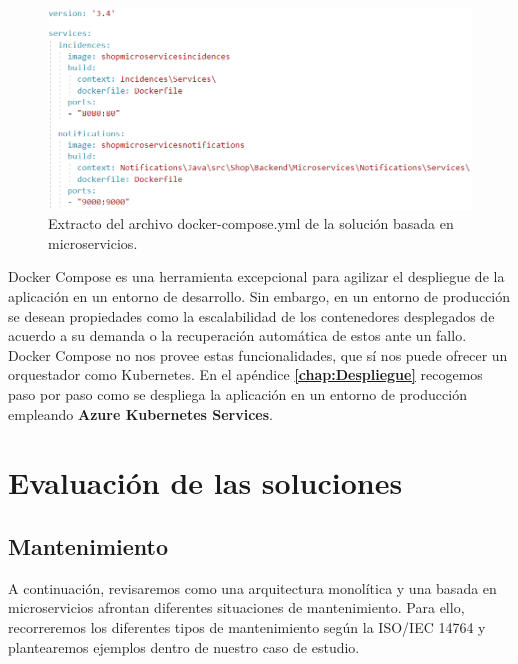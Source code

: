 \documentclass[11pt,spanish,listoffigures]{tfgetsinf}
\begin{document}
\begin{figure}[h]
\centering
\includegraphics[scale=0.7]{Compose}
\caption{Extracto del archivo docker-compose.yml de la solución basada en microservicios.}
\label{fig:Compose}
\end{figure}

Docker Compose es una herramienta excepcional para agilizar el despliegue de la aplicación en un entorno de desarrollo. Sin embargo, en un entorno de producción se desean propiedades como la escalabilidad de los contenedores desplegados de acuerdo a su demanda o la recuperación automática de estos ante un fallo. Docker Compose no nos provee estas funcionalidades, que sí nos puede ofrecer un orquestador como Kubernetes. En el apéndice \textbf{\ref{chap:Despliegue} } recogemos paso por paso como se despliega la aplicación en un entorno de producción empleando \textbf{Azure Kubernetes Services}.

%

\chapter{Evaluación de las soluciones}

\section{Mantenimiento} \label{sect:Mantenimiento}

A continuación, revisaremos como una arquitectura monolítica y una basada en microservicios afrontan diferentes situaciones de mantenimiento. Para ello, recorreremos los diferentes tipos de mantenimiento según la ISO/IEC 14764 y plantearemos ejemplos dentro de nuestro caso de estudio. 
\end{document}
